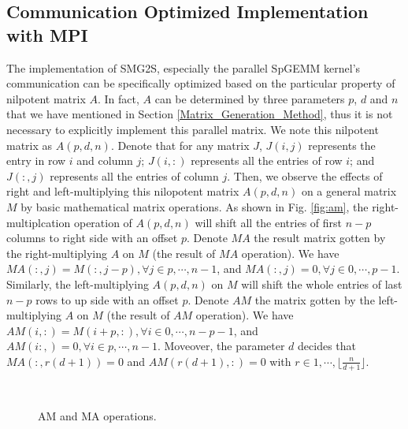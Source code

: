 \subsection{Communication Optimized Implementation with MPI}

The implementation of SMG2S, especially the parallel SpGEMM kernel's communication can be specifically optimized based on the particular property of nilpotent matrix $A$. In fact, $A$ can be determined by three parameters $p$, $d$ and $n$ that we have mentioned in Section \ref{Matrix_Generation_Method}, thus it is not necessary to explicitly implement this parallel matrix. We note this nilpotent matrix as $A(p,d,n)$. Denote that for any matrix $J$, $J(i,j)$ represents the entry in row $i$ and column $j$; $J(i,:)$ represents all the entries of row $i$; and $J(:,j)$ represents all the entries of column $j$. Then, we observe the effects of right and left-multiplying this nilopotent matrix $A(p,d,n)$ on a general matrix $M$ by basic mathematical matrix operations. As shown in Fig. \ref{fig:am}, the right-multiplcation operation of $A(p,d,n)$ will shift all the entries of first $n-p$ columns to right side with an offset $p$. Denote $MA$ the result matrix gotten by the right-multiplying $A$ on $M$ (the result of $MA$ operation). We have $MA(:,j)=M(:,j-p), \forall j \in p,\cdots, n-1$, and $MA(:,j)=0,  \forall j \in 0,\cdots, p-1$. Similarly, the left-multiplying $A(p,d,n)$ on $M$ will shift the whole entries of last $n-p$ rows to up side with an offset $p$. Denote $AM$ the matrix gotten by the left-multiplying $A$ on $M$ (the result of $AM$ operation). We have $AM(i,:)=M(i+p,:), \forall i \in 0,\cdots, n-p-1$, and $AM(i:,)=0,  \forall i \in p,\cdots, n-1$. Moveover, the parameter $d$ decides that $MA(:,r(d+1))=0$ and $AM(r(d+1),:)=0$ with $r \in 1, \cdots, \lfloor \frac{n}{d+1}\rfloor$. 

\begin{figure}[htbp]
	\centering
	\\
		\caption{AM and MA operations. }
	\label{fig:amma}
\end{figure}


